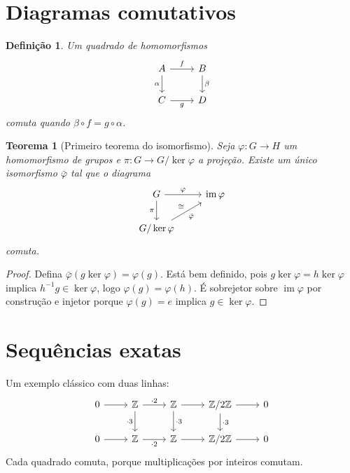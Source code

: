 \documentclass[11pt]{article}
\newtheorem{teorema}{Teorema}
\newtheorem{definicao}{Definição}
\newcommand{\im}{\operatorname{im}}
\newcommand{\Z}{\mathbb{Z}}
\begin{document}
\section{Diagramas comutativos}

\begin{definicao}
Um quadrado de homomorfismos
\[
\begin{tikzcd}
A \arrow[r, "f"] \arrow[d, "\alpha"'] & B \arrow[d, "\beta"] \\
C \arrow[r, "g"'] & D
\end{tikzcd}
\]
\emph{comuta} quando $\beta\circ f = g\circ\alpha$.
\end{definicao}

\begin{teorema}[Primeiro teorema do isomorfismo]
Seja $\varphi\colon G\to H$ um homomorfismo de grupos e $\pi\colon G\to G/\ker\varphi$ a projeção. Existe um único isomorfismo $\bar\varphi$ tal que o diagrama
\[
\begin{tikzcd}
G \arrow[r, "\varphi"] \arrow[d, "\pi"'] & \im\varphi \\
G/\ker\varphi \arrow[ur, "\bar\varphi"', "\cong"]
\end{tikzcd}
\]
comuta.
\end{teorema}

\begin{proof}
Defina $\bar\varphi(g\ker\varphi)=\varphi(g)$. Está bem definido, pois $g\ker\varphi=h\ker\varphi$ implica $h^{-1}g\in\ker\varphi$, logo $\varphi(g)=\varphi(h)$. É sobrejetor sobre $\im\varphi$ por construção e injetor porque $\varphi(g)=e$ implica $g\in\ker\varphi$.
\end{proof}

\section{Sequências exatas}

Um exemplo clássico com duas linhas:
\[
\begin{tikzcd}
0 \arrow[r] & \Z \arrow[r, "\cdot 2"] \arrow[d, "\cdot 3"'] & \Z \arrow[r] \arrow[d, "\cdot 3"] & \Z/2\Z \arrow[r] \arrow[d, "\cdot 3"] & 0 \\
0 \arrow[r] & \Z \arrow[r, "\cdot 2"'] & \Z \arrow[r] & \Z/2\Z \arrow[r] & 0
\end{tikzcd}
\]
Cada quadrado comuta, porque multiplicações por inteiros comutam.
\end{document}

